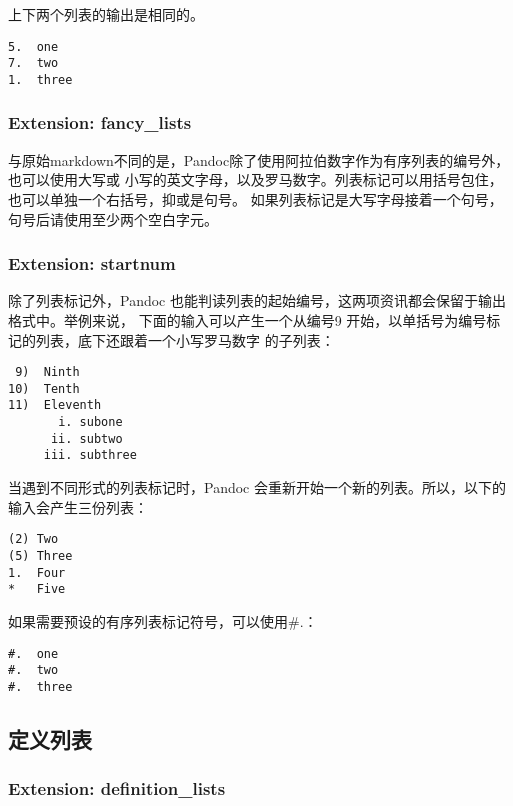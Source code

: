 \documentclass[fancyhdr,bookmark]{ctexbook}
\begin{document}
上下两个列表的输出是相同的。

\begin{lstlisting}
5.  one
7.  two
1.  three
\end{lstlisting}

\subsubsection{Extension: fancy\_lists}\label{extension-fancyux5flists}

与原始markdown不同的是，Pandoc除了使用阿拉伯数字作为有序列表的编号外，也可以使用大写或
小写的英文字母，以及罗马数字。列表标记可以用括号包住，也可以单独一个右括号，抑或是句号。
如果列表标记是大写字母接着一个句号，句号后请使用至少两个空白字元。

\subsubsection{Extension: startnum}\label{extension-startnum}

除了列表标记外，Pandoc
也能判读列表的起始编号，这两项资讯都会保留于输出格式中。举例来说，
下面的输入可以产生一个从编号9
开始，以单括号为编号标记的列表，底下还跟着一个小写罗马数字 的子列表：

\begin{lstlisting}
 9)  Ninth
10)  Tenth
11)  Eleventh
       i. subone
      ii. subtwo
     iii. subthree
\end{lstlisting}

当遇到不同形式的列表标记时，Pandoc
会重新开始一个新的列表。所以，以下的输入会产生三份列表：

\begin{lstlisting}
(2) Two
(5) Three
1.  Four
*   Five
\end{lstlisting}

如果需要预设的有序列表标记符号，可以使用\#.：

\begin{lstlisting}
#.  one
#.  two
#.  three
\end{lstlisting}

\subsection{定义列表}\label{ux5b9aux4e49ux5217ux8868}

\subsubsection{Extension:
definition\_lists}\label{extension-definitionux5flists}
\end{document}
